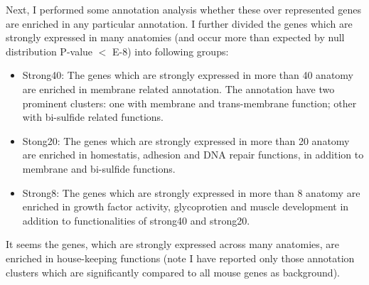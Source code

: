 \documentclass{article}
\begin{document}
Next, I performed some annotation analysis whether these over represented genes are enriched in any particular annotation. I further divided the genes which are strongly expressed in many anatomies (and occur more than expected by null distribution P-value $<$ E-8) into following groups:
\begin{itemize}
	\item Strong40: The genes which are strongly expressed in more than 40 anatomy are enriched in membrane
		related annotation. The annotation have two prominent clusters: one with membrane and trans-membrane function; other with bi-sulfide  related functions.
	\item  Stong20: The genes which are strongly expressed in more than 20 anatomy are enriched in homestatis, adhesion and DNA repair functions,
		in addition to membrane and bi-sulfide functions.
	\item  Strong8: The genes which are strongly expressed in more than 8 anatomy are enriched in growth factor activity, glycoprotien and muscle 
		development
		in addition to functionalities of strong40 and strong20.
\end{itemize}


It seems the genes, which are strongly expressed across many anatomies, are enriched in house-keeping functions (note I have reported only those annotation clusters which
are significantly compared to all mouse genes as background). 




\end{document}
